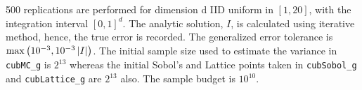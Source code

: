 \documentclass{iitthesis}
\theoremstyle{definition}
\begin{document}
%
500 replications are performed for dimension d IID uniform in $[1,20]$, with the integration interval $[0,1]^d$. The analytic solution, $I$, is calculated using iterative method, hence, the true error is recorded. The generalized error tolerance is $\max\left(10^{-3},10^{-3}\left \lvert I \right \rvert\right)$. The initial sample size used to estimate the variance in {\tt cubMC\_g} is $2^{13}$ whereas the initial Sobol's and Lattice points taken in {\tt cubSobol\_g} and {\tt cubLattice\_g} are $2^{13}$ also. The sample budget is $10^{10}$. 
\end{document}
